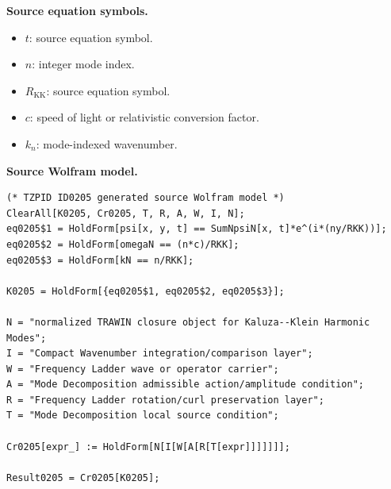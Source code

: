 \begin{minipage}[t]{0.49\linewidth}
\begingroup
\small
\raggedright
\textbf{Source equation symbols.}\par
\begin{itemize}[leftmargin=1.35em,itemsep=1pt,topsep=1pt,parsep=0pt]
    \item $t$: source equation symbol.
    \item $n$: integer mode index.
    \item $R_{\mathrm{KK}}$: source equation symbol.
    \item $c$: speed of light or relativistic conversion factor.
    \item $k_n$: mode-indexed wavenumber.
\end{itemize}
\endgroup
\end{minipage}\hfill
\begin{minipage}[t]{0.47\linewidth}
\begingroup
\scriptsize
\raggedright
\textbf{Source Wolfram model.}\par
\begin{Verbatim}[fontsize=\tiny,breaklines=true,breakanywhere=true]
(* TZPID ID0205 generated source Wolfram model *)
ClearAll[K0205, Cr0205, T, R, A, W, I, N];
eq0205$1 = HoldForm[psi[x, y, t] == SumNpsiN[x, t]*e^(i*(ny/RKK))];
eq0205$2 = HoldForm[omegaN == (n*c)/RKK];
eq0205$3 = HoldForm[kN == n/RKK];

K0205 = HoldForm[{eq0205$1, eq0205$2, eq0205$3}];

N = "normalized TRAWIN closure object for Kaluza--Klein Harmonic Modes";
I = "Compact Wavenumber integration/comparison layer";
W = "Frequency Ladder wave or operator carrier";
A = "Mode Decomposition admissible action/amplitude condition";
R = "Frequency Ladder rotation/curl preservation layer";
T = "Mode Decomposition local source condition";

Cr0205[expr_] := HoldForm[N[I[W[A[R[T[expr]]]]]]];

Result0205 = Cr0205[K0205];
\end{Verbatim}
\endgroup
\end{minipage}

